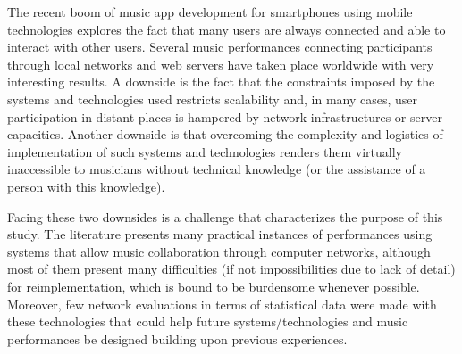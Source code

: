 

The recent boom of music app development for smartphones using mobile technologies explores the fact that many users are always connected and able to interact with other users. 
Several music performances connecting participants through local networks and web servers have taken place worldwide with very interesting results. 
A downside is the fact that the constraints imposed by the systems and technologies used restricts scalability and, in many cases, user participation in distant places is hampered by network infrastructures or server capacities. 
Another downside is that overcoming the complexity and logistics of implementation of such systems and technologies renders them virtually inaccessible to musicians without technical knowledge (or the assistance of a person with this knowledge).

Facing these two downsides is a challenge that characterizes the purpose of this study.
The literature presents many practical instances of performances using systems that allow music collaboration through computer networks, although most of them present many difficulties (if not impossibilities due to lack of detail) for reimplementation, which is bound to be burdensome whenever possible.
Moreover, few network evaluations in terms of statistical data were made with these technologies that could help future systems/technologies and music performances be designed building upon previous experiences.

